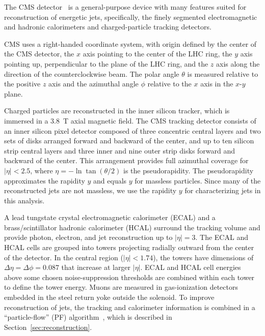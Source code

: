 \label{sec:cms_detector}


The CMS detector~\cite{:2008zzk}
is a general-purpose device with 
many features suited for reconstruction of 
energetic jets, specifically, the finely segmented electromagnetic
and hadronic calorimeters and charged-particle tracking detectors.


CMS uses a right-handed coordinate system, with origin 
defined by the center of the CMS detector, 
the $x$ axis pointing to the center of the LHC ring, 
the $y$ axis pointing up, perpendicular to the plane of the LHC ring, 
and the $z$ axis along the direction of the counterclockwise beam. 
The polar angle $\theta$ is measured relative to the positive $z$ 
axis and the azimuthal angle $\phi$ relative to the $x$ axis in the $x$-$y$ plane.


Charged particles are reconstructed in the inner silicon tracker,
which is immersed in a $3.8$~T axial magnetic field. 
The CMS tracking detector consists of an inner silicon pixel detector
composed of three concentric central layers and two sets of disks
arranged forward and backward of the center, 
and up to ten silicon strip central layers and three inner and nine
outer strip disks forward and backward of the center. 
This arrangement provides 
full azimuthal coverage for $|\eta| < 2.5$, where 
$\eta = -\ln\tan(\theta/2)$ is the pseudorapidity.
The pseudorapidity approximates the rapidity $y$
and 
equals $y$ for massless particles.
Since many of the reconstructed jets
are not massless, we use the rapidity $y$ for characterizing
jets in this analysis.


A lead tungstate crystal electromagnetic calorimeter (ECAL) and 
a brass/scintillator hadronic calorimeter (HCAL) surround the tracking
volume and provide photon, electron, and jet reconstruction up to $|\eta|=3$.
The ECAL and HCAL cells are grouped into towers projecting radially 
outward from the center of the detector.  
In the central region ($|\eta|<1.74$), 
the towers have dimensions of $\Delta\eta = \Delta\phi = 0.087$ 
that increase at larger $|\eta|$.  
ECAL and HCAL cell energies above some chosen noise-suppression 
thresholds are combined within each tower to define the tower energy. 
Muons are measured in gas-ionization detectors embedded in the steel 
return yoke outside the solenoid. 
To improve reconstruction of jets, the tracking and calorimeter 
information is combined in a ``particle-flow'' (PF)
algorithm~\cite{particleflow}, which is described in 
Section~\ref{sec:reconstruction}.



